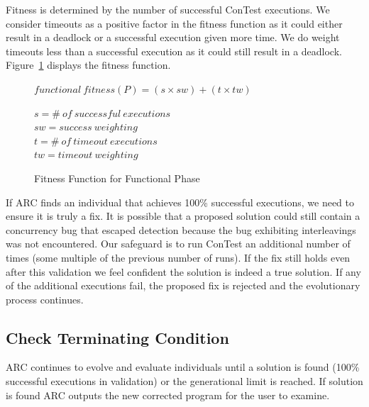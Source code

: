 \documentclass{llncs}
\begin{document}
Fitness is determined by the number of successful ConTest executions.
We consider timeouts as a positive
factor in the fitness function as it could either result in a deadlock or a
successful execution given more time. We do weight timeouts less than a
successful execution as it could still result in a deadlock.
Figure~\ref{fig:functional_fitness} displays the fitness function.

\begin{figure}[h]
\begin{footnotesize}
\begin{center}
$functional\ fitness(P) = (s \times sw) + (t \times tw)$
\end{center}
\end{footnotesize}
\begin{scriptsize}
\begin{center}
$s = \#\ of\ successful\ executions$ \\
$sw = success\ weighting$ \\
$t = \#\ of\ timeout\ executions$ \\
$tw = timeout\ weighting$
\end{center}
\end{scriptsize}
\caption{Fitness Function for Functional Phase}
\label{fig:functional_fitness}
\end{figure}

If ARC finds an individual that achieves 100\% successful executions,
we need to ensure it is truly a fix. It is possible that a
proposed solution could still contain a concurrency bug that escaped detection
because the bug exhibiting interleavings was not encountered. Our safeguard is
to run ConTest an additional number of times (some multiple of the previous
number of runs). If the fix still holds even after this validation we feel
confident the solution is indeed a true solution. If any of the additional
executions fail, the proposed fix is rejected and the evolutionary process
continues.


\subsection{Check Terminating Condition}
\label{sec:check_terminating_condition}

ARC continues to evolve and evaluate individuals until
a solution is found (100\% successful executions in validation) or the generational limit is reached. If solution is found ARC outputs the new corrected program for the user to examine.
\end{document}
